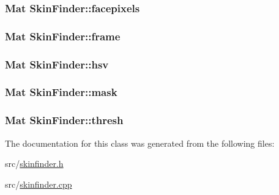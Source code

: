 \hypertarget{class_skin_finder_a93fd2ba0d7494ec4aa2443352fe4f961}{
\subsubsection[{facepixels}]{\setlength{\rightskip}{0pt plus 5cm}Mat {\bf SkinFinder::facepixels}}}
\label{class_skin_finder_a93fd2ba0d7494ec4aa2443352fe4f961}
\hypertarget{class_skin_finder_ae7f9082d757d32f18c06b1f4ab600467}{
\subsubsection[{frame}]{\setlength{\rightskip}{0pt plus 5cm}Mat {\bf SkinFinder::frame}}}
\label{class_skin_finder_ae7f9082d757d32f18c06b1f4ab600467}
\hypertarget{class_skin_finder_a5e36bd9b188370eb528beeed691d6d2f}{
\subsubsection[{hsv}]{\setlength{\rightskip}{0pt plus 5cm}Mat {\bf SkinFinder::hsv}}}
\label{class_skin_finder_a5e36bd9b188370eb528beeed691d6d2f}
\hypertarget{class_skin_finder_a40173df66e4ec87e0c69c4858e49f7a7}{
\subsubsection[{mask}]{\setlength{\rightskip}{0pt plus 5cm}Mat {\bf SkinFinder::mask}}}
\label{class_skin_finder_a40173df66e4ec87e0c69c4858e49f7a7}
\hypertarget{class_skin_finder_a199a4f558e062704a4c24d65801e47ba}{
\subsubsection[{thresh}]{\setlength{\rightskip}{0pt plus 5cm}Mat {\bf SkinFinder::thresh}}}
\label{class_skin_finder_a199a4f558e062704a4c24d65801e47ba}


The documentation for this class was generated from the following files:\begin{DoxyCompactItemize}
\item 
src/\hyperlink{skinfinder_8h}{skinfinder.h}\item 
src/\hyperlink{skinfinder_8cpp}{skinfinder.cpp}\end{DoxyCompactItemize}
